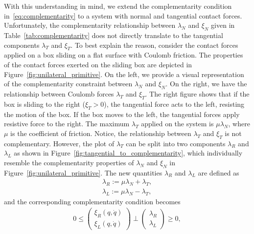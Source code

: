 With this understanding in mind, we extend the complementarity condition
in~\eqref{eq:complementarity} to a system with normal and tangential contact
forces.
%
Unfortunately, the complementarity relationship between $\lambda_N$ and $\xi_N$
given in Table~\ref{tab:complementarity} does not directly translate to the
tangential components $\lambda_T$ and $\xi_T$.
%
%
To best explain the reason, consider the contact forces applied on a box sliding
on a flat surface with Coulomb friction.
%
The properties of the contact forces exerted on the sliding box are depicted in
Figure~\ref{fig:unilateral_primitive}.
%
On the left, we provide a visual representation of the complementarity
constraint between $\lambda_N$ and $\xi_N$.
%
On the right, we have the relationship between Coulomb forces $\lambda_T$ and
$\xi_T$.
%
The right figure shows that if the box is sliding to the right ($\xi_T > 0$),
the tangential force acts to the left, resisting the motion of the box.
%
If the box moves to the left, the tangential forces apply resistive force to
the right.
%
The maximum $\lambda_T$ applied on the system is $\mu \lambda_N$, where $\mu$ is
the coefficient of friction.
%
Notice, the relationship between $\lambda_T$ and $\xi_T$ is not complementary.
%
However, the plot of $\lambda_T$ can be split into two components $\lambda_R$
and $\lambda_L$ as shown in Figure~\ref{fig:tangential_to_complementarity},
which individually resemble the complementarity properties of $\lambda_N$ and
$\xi_N$ in Figure~\ref{fig:unilateral_primitive}.
%
The new quantities $\lambda_R$ and $\lambda_L$ are defined as~\cite{glocker2005formulation}
\begin{align*}
  \lambda_R := \mu \lambda_N + \lambda_T, \\
  \lambda_L := \mu \lambda_N - \lambda_T, 
\end{align*}
\noindent and the corresponding complementarity condition becomes
%
\begin{equation}
  \begin{gathered}
    0 \leq 
    \begin{pmatrix}
      \xi_R(q, \dot{q}) \\
      \xi_L(q, \dot{q})
    \end{pmatrix} 
    \perp
      \begin{pmatrix}
        \lambda_R  \\
        \lambda_L
      \end{pmatrix} \geq 0,
    \end{gathered}
    \label{eq:tangential_complementarity}
\end{equation}
